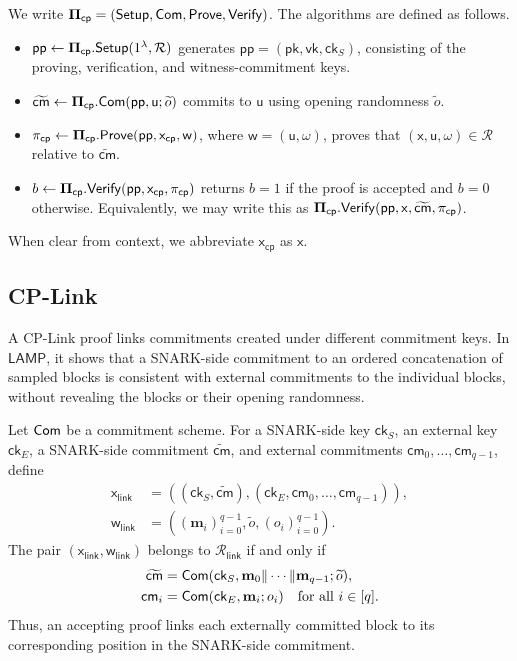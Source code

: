 \documentclass[conference,compsoc]{IEEEtran}
\newcommand{\para}{\textsf{pp}}
\newcommand{\cm}{\textsf{cm}}
\newcommand{\ck}{\textsf{ck}}
\newcommand{\vect}{\mathbf}         %
\newcommand{\bPi}{{\bf \Pi}}
\newcommand{\setup}{{\sf Setup}}
\newcommand{\com}{{\sf Com}}
\newcommand{\prove}{{\sf Prove}}
\renewcommand{\verify}{{\sf Verify}}
\newcommand{\relation}{{\mathcal{R}}}
\newcommand{\cp}{{\mathsf{cp}}}
\renewcommand{\pk}{{\textsf{pk}}}
\renewcommand{\vk}{{\textsf{vk}}}
\renewcommand{\ck}{{\textsf{ck}}}
\newcommand{\stmt}{\mathsf{x}}      %
\newcommand{\wit}{\mathsf{w}}       %
\newcommand{\comwit}{\mathsf{u}}
\newcommand{\protocol}{\textsf{LAMP}}   %
\theoremstyle{plain}
\theoremstyle{definition}
\theoremstyle{remark}
\begin{document}
We write \(\bPi_{\cp}=(\setup,\com,\prove,\verify)\). The algorithms are
defined as follows.
\begin{itemize}[leftmargin=*,nosep]
  \item \(\para\gets\bPi_{\cp}.\setup(1^\lambda,\relation)\) generates
  \(\para=(\pk,\vk,\ck_S)\), consisting of the proving, verification, and
  witness-commitment keys.

  \item \(\widetilde{\cm}\gets
  \bPi_{\cp}.\com(\para,\comwit;\widetilde{o})\) commits to \(\comwit\) using
  opening randomness \(\widetilde{o}\).

  \item \(\pi_{\cp}\gets
  \bPi_{\cp}.\prove(\para,\stmt_{\cp},\wit)\), where
  \(\wit=(\comwit,\omega)\), proves that
  \((\stmt,\comwit,\omega)\in\relation\) relative to
  \(\widetilde{\cm}\).

  \item \(b\gets
  \bPi_{\cp}.\verify(\para,\stmt_{\cp},\pi_{\cp})\) returns \(b=1\) if the
  proof is accepted and \(b=0\) otherwise. Equivalently, we may write this as
  \(\bPi_{\cp}.\verify(\para,\stmt,\widetilde{\cm},\pi_{\cp})\).
\end{itemize}
When clear from context, we abbreviate \(\stmt_{\cp}\) as \(\stmt\).
\subsection{CP-Link}
\label{sec:prelim-cplink}

A CP-Link proof links commitments created under different commitment keys. In
\(\protocol\), it shows that a SNARK-side commitment to an ordered
concatenation of sampled blocks is consistent with external commitments to the
individual blocks, without revealing the blocks or their opening randomness.

Let \(\com\) be a commitment scheme. For a SNARK-side key \(\ck_S\), an
external key \(\ck_E\), a SNARK-side commitment \(\widetilde{\cm}\), and
external commitments \(\cm_0,\ldots,\cm_{q-1}\), define
\[
\begin{aligned}
\stmt_{\mathsf{link}}
&=
((\ck_S,\widetilde{\cm}),
(\ck_E,\cm_0,\ldots,\cm_{q-1})),\\
\wit_{\mathsf{link}}
&=
((\vect{m}_i)_{i=0}^{q-1},\widetilde{o},(o_i)_{i=0}^{q-1}).
\end{aligned}
\]
The pair \((\stmt_{\mathsf{link}},\wit_{\mathsf{link}})\) belongs to
\(\relation_{\mathsf{link}}\) if and only if
\[
\begin{aligned}
\widetilde{\cm}
&=
\com(\ck_S,\vect{m}_0\|\cdots\|\vect{m}_{q-1};\widetilde{o}),\\
\cm_i
&=
\com(\ck_E,\vect{m}_i;o_i)
\quad \text{for all }i\in[q].
\end{aligned}
\]
Thus, an accepting proof links each externally committed block to its
corresponding position in the SNARK-side commitment.
\end{document}
